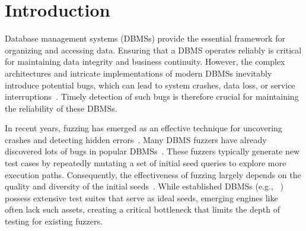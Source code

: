 \documentclass[conference]{IEEEtran}
\begin{document}
\section{Introduction}

%
Database management systems (DBMSs) provide the essential framework for organizing and accessing data.
Ensuring that a DBMS operates reliably is critical for maintaining data integrity and business continuity.
However, the complex architectures and intricate implementations of modern DBMSs inevitably introduce potential bugs, which can lead to system crashes, data loss, or service interruptions~\cite{pgbugs, mysqlbugs}.
Timely detection of such bugs is therefore crucial for maintaining the reliability of these DBMSs.

In recent years, fuzzing has emerged as an effective technique for uncovering crashes and detecting hidden errors~\cite{afl, libfuzzer, aflpp, pafl}. 
Many DBMS fuzzers have already discovered lots of bugs in popular DBMSs~\cite{sqlsmithbug, DBbugs, sqlsmith}. 
These fuzzers typically generate new test cases by repeatedly mutating a set of initial seed queries to explore more execution paths. Consequently, the effectiveness of fuzzing largely depends on the quality and diversity of the initial seeds~\cite{fu2022griffin, liang2023sequence, zhong2020squirrel}.
While established DBMSs (e.g., \pg{}~\cite{pg_git}) possess extensive test suites that serve as ideal seeds, emerging engines like \duckdb{}~\cite{duckdb_git} often lack such assets, creating a critical bottleneck that limits the depth of testing for existing fuzzers.
\end{document}

